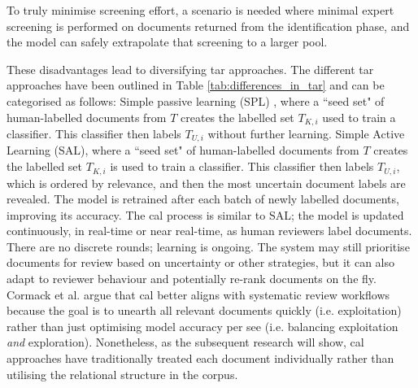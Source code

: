 \documentclass[10pt,oneside]{book}
\begin{document}
To truly minimise screening effort, a scenario is needed where minimal expert screening is performed on documents returned from the identification phase, and the model can safely extrapolate that screening to a larger pool.

These disadvantages lead to diversifying \gls*{tar} approaches. The different \gls*{tar} approaches have been outlined in Table \ref{tab:differences_in_tar} and can be categorised as follows: Simple passive learning (SPL) \cite{cohen_reducing_2006}, where a ``seed set" of human-labelled documents from $T$ creates the labelled set $T_{K,i}$ used to train a classifier. This classifier then labels $T_{U, i}$ without further learning. Simple Active Learning (SAL), where a ``seed set" of human-labelled documents from $T$ creates the labelled set $T_{K,i}$ is used to train a classifier. This classifier then labels $T_{U, i}$, which is ordered by relevance, and then the most uncertain document labels are revealed. The model is retrained after each batch of newly labelled documents, improving its accuracy. The \gls*{cal} process is similar to SAL; the model is updated continuously, in real-time or near real-time, as human reviewers label documents. There are no discrete rounds; learning is ongoing. The system may still prioritise documents for review based on uncertainty or other strategies, but it can also adapt to reviewer behaviour and potentially re-rank documents on the fly. Cormack et al. \cite{cormack_autonomy_2015} argue that \gls*{cal} better aligns with systematic review workflows because the goal is to unearth all relevant documents quickly (i.e. exploitation) rather than just optimising model accuracy per see (i.e. balancing exploitation \emph{and} exploration). Nonetheless, as the subsequent research will show, \gls*{cal} approaches have traditionally treated each document individually rather than utilising the relational structure in the corpus.
\end{document}
